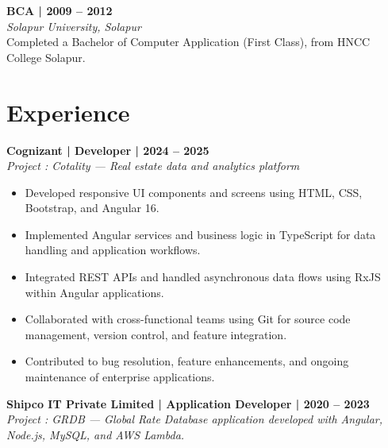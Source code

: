\documentclass[11pt,a4paper]{article}
\newcommand{\blueitem}[1]{\textcolor{subtitleblue}{\textbf{#1}}}
\begin{document}
\vspace{0.3em}

\blueitem{BCA | 2009 -- 2012} \\
\textit{Solapur University, Solapur} \\
Completed a Bachelor of Computer Application (First Class), from HNCC College Solapur.

\vspace{0.2em}

\section*{Experience}

\blueitem{Cognizant | Developer | 2024 -- 2025} \\
\textit{Project : Cotality — Real estate data and analytics platform}

\begin{itemize}
    \item Developed responsive UI components and screens using HTML, CSS, Bootstrap, and Angular 16.
    
    \item Implemented Angular services and business logic in TypeScript for data handling and application workflows.
    
    \item Integrated REST APIs and handled asynchronous data flows using RxJS within Angular applications.
    
    \item Collaborated with cross-functional teams using Git for source code management, version control, and feature integration.
    
    \item Contributed to bug resolution, feature enhancements, and ongoing maintenance of enterprise applications.
\end{itemize}

\vspace{0.3em}

\blueitem{Shipco IT Private Limited | Application Developer | 2020 -- 2023} \\
\textit{Project : GRDB — Global Rate Database application developed with Angular, Node.js, MySQL, and AWS Lambda.}
\end{document}
